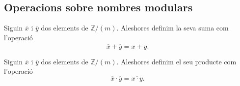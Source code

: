 \documentclass[../Apunts.tex]{subfiles}
\begin{document}
	\subsection{Operacions sobre nombres modulars} %
	\begin{definition}
		\label{def:suma de nombres modulars}
		Siguin \(\overline{x}\) i \(\overline{y}\) dos elements de \(\mathbb{Z}/(m)\). Aleshores definim la seva suma com l'operació
		\[\overline{x}+\overline{y}=\overline{x+y}.\]
	\end{definition}
	\begin{definition}
		\label{def:producte de nombres modulars}
		Siguin \(\overline{x}\) i \(\overline{y}\) dos elements de \(\mathbb{Z}/(m)\). Aleshores definim el seu producte com l'operació
		\[\overline{x}\cdot\overline{y}=\overline{x\cdot y}.\]
	\end{definition}
\end{document}
